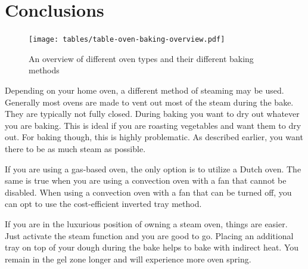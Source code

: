 \section{Conclusions}

\begin{figure}[!htb]
  \texttt{[image: tables/table-oven-baking-overview.pdf]}
  \caption{An overview of different oven types and their different baking methods}
\end{figure}

Depending on your home oven, a different method
of steaming may be used. Generally most ovens
are made to vent out most of the steam during the
bake. They are typically not fully closed. During
baking you want to dry out whatever you are baking.
This is ideal if you are roasting vegetables and
want them to dry out. For baking though, this is
highly problematic. As described earlier, you
want there to be as much steam as possible.

If you are using a gas-based oven, the only option
is to utilize a Dutch oven. The same is true when you
are using a convection oven with a fan that
cannot be disabled. When using a convection
oven with a fan that can be turned off, you can
opt to use the cost-efficient inverted tray
method.

If you are in the luxurious
position of owning a steam oven, things are easier.
Just activate the steam function and you are
good to go. Placing an additional tray on top of your
dough during the bake helps to bake with indirect
heat. You remain in the gel zone longer and
will experience more oven spring.
